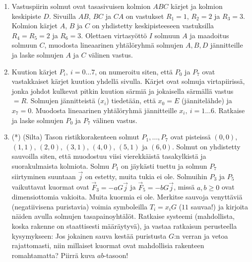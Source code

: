 \Harj
\begin{enumerate}

\item
Vastuspiirin solmut ovat tasasivuisen kolmion $ABC$ kärjet ja kolmion keskipiste $D$. Sivuilla
$AB$, $BC$ ja $CA$ on vastukset $R_1=1$, $R_2=2$ ja $R_3=3$. Kolmion kärjet $A$, $B$ ja $C$
on yhdistetty keskipisteeseen vastuksilla $R_4=R_5=2$ ja $R_6=3$. Olettaen virtasyöttö $I$
solmuun $A$ ja maadoitus solmuun $C$, muodosta lineaarinen yhtälöryhmä solmujen $A,B,D$ 
jännitteille ja laske solmujen $A$ ja $C$ välinen vastus.

\item
Kuution kärjet $P_i,\ i=0 \ldots 7$, on numeroitu siten, että $P_0$ ja $P_7$ ovat vastakkaiset
kärjet kuution yhdellä sivulla. Kärjet ovat solmuja virtapiirissä, jonka johdot kulkevat
pitkin kuution särmiä ja jokaisella särmällä vastus $=R$. Solmujen jännitteistä ($x_i$)
tiedetään, että $x_0=E$ (jännitelähde) ja $x_7=0$. Muodosta lineaarinen yhtälöryhmä
jännitteille $x_i,\ i=1 \ldots 6$. Ratkaise ja laske solmujen $P_0$ ja $P_7$ välinen vastus.

\item (*) 
(Silta) Tason ristikkorakenteen solmut $P_1,\ldots,P_7$ ovat pisteissä $(0,0)$, $(1,1)$,
$(2,0)$, $(3,1)$, $(4,0)$, $(5,1)$ ja $(6,0)$. Solmut on yhdistetty sauvoilla siten, että
muodostuu viisi vierekkäistä tasakylkistä ja suorakulmaista kolmiota. Solmu $P_1$ on jäykästi
tuettu ja solmun $P_7$ siirtyminen suuntaan $\vec j$ on estetty, muita tukia ei ole. Solmuihin
$P_3$ ja $P_5$ vaikuttavat kuormat ovat $\vec F_3=-a G\vec j$ ja $\vec F_5=-bG\vec j$, missä
$a,b \ge 0$ ovat dimensiottomia vakioita. Muita kuormia ei ole. Merkitse sauvoja
venyttäviä (negatiivisena puristavia) voimia symboleilla $T_i=x_iG$ ($11$ sauvaa!) ja kirjoita
näiden avulla solmujen tasapainoyhtälöt. Ratkaise systeemi (mahdollista, koska rakenne on
staattisesti määräytyvä), ja vastaa ratkaisun perusteella kysymykseen: Jos jokainen sauva
kestää puristusta $G$:n verran ja vetoa rajattomasti, niin millaiset kuormat ovat mahdollisia
rakenteen romahtamatta? Piirrä kuva $ab$-tasoon!

\end{enumerate}